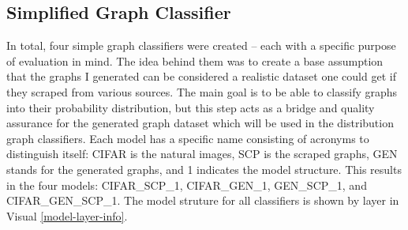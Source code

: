 \documentclass[12pt]{article}
\begin{document}
        \subsection{Simplified Graph Classifier}

            In total, four simple graph classifiers were created -- each with a specific purpose of evaluation in mind. 
            The idea behind them was to create a base assumption that the graphs I generated can be considered a realistic dataset 
            one could get if they scraped from various sources. 
            The main goal is to be able to classify graphs into their probability distribution, 
            but this step acts as a bridge and quality assurance for the generated graph dataset 
            which will be used in the distribution graph classifiers. 
            Each model has a specific name consisting of acronyms to distinguish itself: 
            CIFAR is the natural images, SCP is the scraped graphs, GEN stands for the generated graphs, 
            and 1 indicates the model structure. This results in the four models: CIFAR\_SCP\_1, CIFAR\_GEN\_1, GEN\_SCP\_1, 
            and CIFAR\_GEN\_SCP\_1. The model struture for all classifiers is shown by layer in Visual \ref{model-layer-info}.
\end{document}
